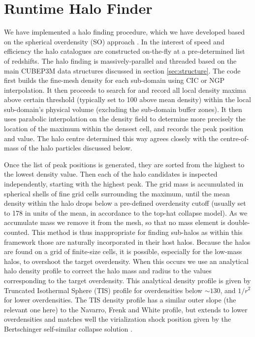 \section{Runtime Halo Finder}
\label{sec:halo}


We have implemented a halo finding procedure, which we have developed 
based on the spherical overdensity (SO) approach \citep{1994MNRAS.271..676L}.
In the interest of speed and efficiency the halo catalogues are constructed 
on-the-fly at a pre-determined list of redshifts. The halo finding is 
massively-parallel and threaded based on the main {\small CUBEP3M} data structures 
discussed in section \ref{sec:structure}. The code first builds the 
fine-mesh density for each sub-domain using CIC or NGP interpolation. It then 
proceeds to search for and record all local density maxima above certain
threshold (typically set to 100 above mean density) within the local 
sub-domain's physical volume (excluding the sub-domain buffer zones). It then 
uses parabolic interpolation on the density field to determine more precisely
the location of the maximum within the densest cell, and records the peak 
position and value. The halo centre determined this way agrees closely with 
the centre-of-mass of the halo particles discussed below.  

Once the list of peak positions is generated, they are sorted from the highest 
to the lowest density value. Then each of the halo candidates is inspected 
independently, starting with the highest peak. The grid mass is accumulated 
in spherical shells of fine grid cells surrounding the maximum, until the 
mean density within the halo drops below a pre-defined overdensity cutoff 
(usually set to 178 in units of the mean, in accordance to the top-hat 
collapse model). As we accumulate mass we remove it from the mesh, so that no 
mass element is double-counted. This method is thus inappropriate for finding 
sub-halos as within this framework those are naturally incorporated in their 
host halos. Because the halos are found on a grid of finite-size cells, it is 
possible, especially for the low-mass halos, to overshoot the target overdensity.
When this occurs we use an analytical halo density profile to correct the 
halo mass and radius to the values corresponding to the target overdensity. 
This analytical density profile is given by Truncated Isothermal Sphere (TIS) 
profile \citep{1999MNRAS.307..203S,2001MNRAS.325..468I} for overdensities below 
$\sim130$, and $1/r^2$ for lower overdensities. The TIS density profile has a
similar outer slope (the relevant one here) to the Navarro, Frenk and White 
\citep[NFW][]{1997ApJ...490..493N} profile, but extends to lower overdensities
and matches well the virialization shock position given by the Bertschinger 
self-similar collapse solution \citep{1985ApJS...58...39B}.

